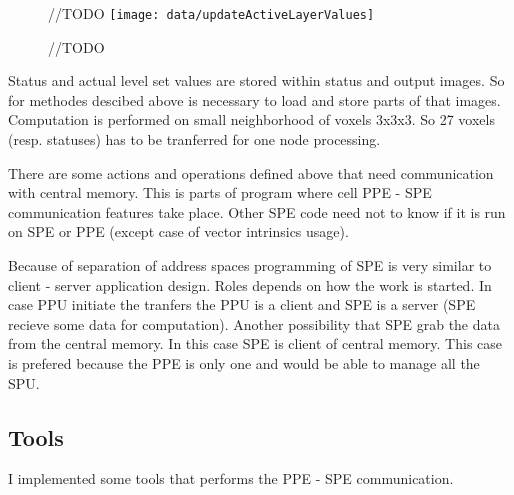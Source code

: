 \begin{figure}	//TODO
    \centering
    \texttt{[image: data/updateActiveLayerValues]}
    \caption[Diagram of new design components]{//TODO}
    \label{fg:updateActiveLayerValues}
\end{figure}

Status and actual level set values are stored within status and output images.
So for methodes descibed above is necessary to load and store parts of that
images. Computation is performed on small neighborhood of voxels 3x3x3. So 27
voxels (resp. statuses) has to be tranferred for one node processing.

There are some actions and operations defined above that need communication
with central memory. This is parts of program where cell PPE - SPE communication
features take place. Other SPE code need not to know if it is run on SPE or PPE
(except case of vector intrinsics usage).

Because of separation of address spaces programming
of SPE is very similar to client - server application design. Roles depends on
how the work is started. In case PPU initiate the tranfers the PPU is a client
and SPE is a server (SPE recieve some data for computation). Another
possibility that SPE grab the data from the central memory. In this case SPE is
client of central memory. This case is prefered because the PPE is only one and
would be able to manage all the SPU.

\subsection{Tools}
I implemented some tools that performs the PPE - SPE communication.

